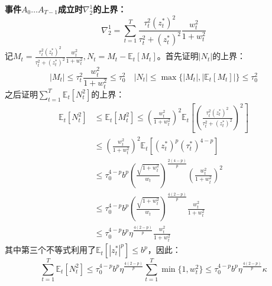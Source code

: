 \documentclass[UTF8,a4paper,10.5pt]{ctexart}
\newcommand{\E}{\mathbb{E}}
\begin{document}
\textbf{事件$A_0 \ldots A_{T-1}$成立时$\nabla^1_2$的上界：}
\begin{equation*}
	\nabla^1_2 = \sum_{t=1}^T \frac{\tau_t^2(z^*_t)^2}{\tau_t^2+(z^*_t)^2}\frac{w_t^2}{1+w_t^2}
\end{equation*}
记$M_t = \frac{\tau_t^2(z^*_t)^2}{\tau_t^2+(z^*_t)^2}\frac{w_t^2}{1+w_t^2}, N_t = M_t - \E_t[M_t]$。首先证明$|N_t|$的上界：
\begin{equation*}
	|M_t|\leq\tau_t^2\frac{w_t^2}{1+w_t^2} \leq \tau_0^2 \quad |N_t|\leq \max\{|M_t|,|\E_t[M_t]|\}\leq \tau_0^2
\end{equation*}
之后证明$\sum_{t=1}^T\E_t[N_t^2]$的上界：
\begin{align*}
	\E_t[N_t^2] &\leq \E_t[M_t^2] \leq \left(\frac{w_t^2}{1+w_t^2}\right)^2 \E_t\left[\left(\frac{\tau_t^2(z^*_t)^2}{\tau_t^2+(z^*_t)^2}\right)^2\right] \\
	& \leq \left(\frac{w_t^2}{1+w_t^2}\right)^2 \E_t[(z_t^*)^p(\tau_t^*)^{4-p}] \\
	& \leq \tau_0^{4-p}b^p \left(\frac{\sqrt{1+w_t^2}}{w_t}\right)^{\frac{2(4-p)}{p}} \left(\frac{w_t^2}{1+w_t^2}\right)^2 \\
	& \leq \tau_0^{4-p}b^p \left(\frac{\sqrt{1+w_t^2}}{w_t}\right)^{\frac{4(2-p)}{p}} \frac{w_t^2}{1+w_t^2} \\
	& \leq \tau_0^{4-p}b^p \eta^{\frac{4(2-p)}{p}} \frac{w_t^2}{1+w_t^2}
\end{align*}
其中第三个不等式利用了$\E_{t}[|z_t^*|^p]\leq b^p$，因此：
\begin{equation*}
	\sum_{t=1}^T \E_t[N_t^2] \leq \tau_0^{4-p}b^p \eta^{\frac{4(2-p)}{p}} \sum_{t=1}^{T} \min\{1,w_t^2\} \leq \tau_0^{4-p}b^p \eta^{\frac{4(2-p)}{p}}\kappa
\end{equation*}
\end{document}
